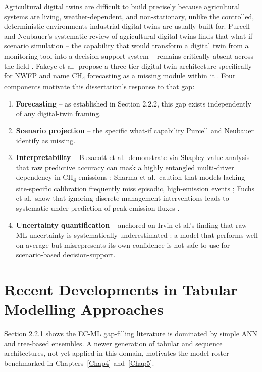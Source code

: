 Agricultural digital twins are difficult to build precisely because agricultural systems are
living, weather-dependent, and non-stationary, unlike the controlled, deterministic environments
industrial digital twins are usually built for. Purcell and Neubauer's systematic review of
agricultural digital twins finds that what-if scenario simulation -- the capability that would
transform a digital twin from a monitoring tool into a decision-support system -- remains
critically absent across the field \cite{purcell2023state}. Fakeye et al.\ propose a three-tier
digital twin architecture specifically for NWFP and name CH\textsubscript{4} forecasting as a
missing module within it \cite{fakeye2024}. Four components motivate this dissertation's response
to that gap:

\begin{enumerate}
    \item \textbf{Forecasting} -- as established in Section 2.2.2, this gap exists independently
    of any digital-twin framing.
    \item \textbf{Scenario projection} -- the specific what-if capability Purcell and Neubauer
    identify as missing.
    \item \textbf{Interpretability} -- Buzacott et al.\ demonstrate via Shapley-value analysis
    that raw predictive accuracy can mask a highly entangled multi-driver dependency in
    CH\textsubscript{4} emissions \cite{buzacott2024}; Sharma et al.\ caution that models lacking
    site-specific calibration frequently miss episodic, high-emission events \cite{sharma2026};
    Fuchs et al.\ show that ignoring discrete management interventions leads to systematic
    under-prediction of peak emission fluxes \cite{fuchs2020}.
    \item \textbf{Uncertainty quantification} -- anchored on Irvin et al.'s finding that raw ML
    uncertainty is systematically underestimated \cite{irvin2021}: a model that performs well on
    average but misrepresents its own confidence is not safe to use for scenario-based
    decision-support.
\end{enumerate}

\section{Recent Developments in Tabular Modelling Approaches}
\label{sec:tabular-modelling}

Section 2.2.1 shows the EC-ML gap-filling literature is dominated by simple ANN and tree-based
ensembles. A newer generation of tabular and sequence architectures, not yet applied in this
domain, motivates the model roster benchmarked in Chapters~\ref{Chap4} and~\ref{Chap5}.

